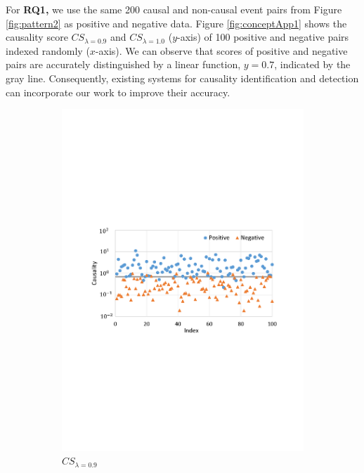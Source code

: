 \documentclass[letterpaper]{article}
\newcommand{\figref}[1]{Figure \ref{#1}}
\begin{document}
For {\bf RQ1,}
we use the same 200 causal and non-causal event pairs from
\figref{fig:pattern2} as positive and negative data.
\figref{fig:conceptApp1}
shows the causality score $CS_{\lambda=0.9}$ and $CS_{\lambda=1.0}$ ($y$-axis)
of 100 positive
and negative pairs indexed randomly ($x$-axis).
We can observe that scores
of positive and negative pairs are accurately distinguished by a
linear function, %
$y=0.7$, indicated by the gray line.
Consequently, existing systems for causality identification and detection
can incorporate our work to improve their accuracy.

\begin{figure}[ht!]
\centering
\begin{subfigure}[t]{0.9\columnwidth}
\centering
\includegraphics[width=0.9\columnwidth]{rq1-a}
\caption{$CS_{\lambda=0.9}$}
\end{subfigure}
\begin{subfigure}[t]{0.9\columnwidth}

\end{subfigure}
\end{figure}
\end{document}
